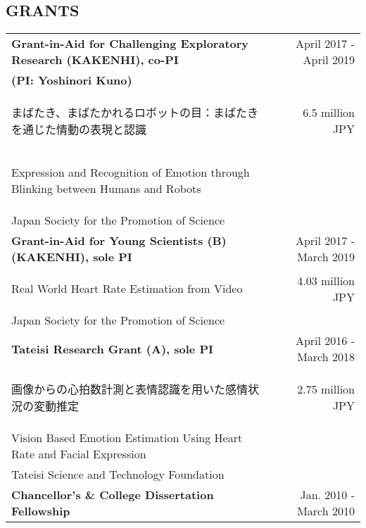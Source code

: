 \documentclass[letterpaper,10pt]{article}
\begin{document}
\subsection*{GRANTS}
\begin{tabularx}{\textwidth}{b{}r}
\bfseries{Grant-in-Aid for Challenging Exploratory Research (KAKENHI), co-PI}
 & {April 2017 - April 2019} \\
\bfseries{(PI: Yoshinori Kuno)} \\
        {\begin{CJK}{UTF8}{min}\begin{small}まばたき、まばたかれるロボットの目：まばたきを通じた情動の表現と認識\end{small}\end{CJK}} & {6.5 million JPY} \\
        {\begin{small}\begin{footnotesize}Expression and Recognition of Emotion through Blinking between Humans and Robots\end{footnotesize}\end{small}} & {} \\
        {Japan Society for the Promotion of Science} & {} \\ \vspace{0.05in}
\bfseries{Grant-in-Aid for Young Scientists (B) (KAKENHI), sole PI} & {April 2017 - March 2019} \\
        {\begin{CJK}{UTF8}{min}Real World Heart Rate Estimation from Video\end{CJK}} & {4.03 million JPY} \\
        {Japan Society for the Promotion of Science} & {} \\ \vspace{0.05in} \bfseries{Tateisi Research Grant (A), sole PI} & {April 2016 - March 2018} \\
        {\begin{CJK}{UTF8}{min}画像からの心拍数計測と表情認識を用いた感情状況の変動推定\end{CJK}} & {2.75 million JPY} \\
        {Vision Based Emotion Estimation Using Heart Rate and Facial Expression} & {} \\
        {Tateisi Science and Technology Foundation} & {} \\ \vspace{0.05in}
\bfseries{Chancellor's \& College Dissertation Fellowship} & {Jan. 2010 - March 2010} \\

\end{tabularx}
\end{document}
